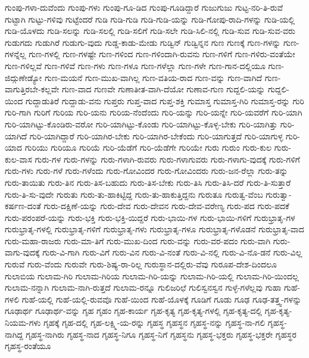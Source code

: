 {ಗುಂಪು-ಗಳಾ-ದುವೆಂದು
ಗುಂಪು-ಗಳು
ಗುಂಪು-ಗೂ-ಡಿದ
ಗುಂಪು-ಗೂಡಿದ್ದಾರೆ
ಗುಜುಗುಜು
ಗುಟ್ಟ-ನರಿ-ತಿ-ರುವೆ
ಗುಟ್ಟಾಗಿ
ಗುಟ್ಟು-ಗಳಿವು
ಗುಟ್ಟೆಂದರೆ
ಗುಡಿ
ಗುಡಿ-ಗುಡಿ
ಗುಡಿ-ಗುಡಿ-ಯನ್ನು
ಗುಡಿ-ಗೋಪು-ರಾದಿ-ಗಳನ್ನು
ಗುಡಿ-ಯಲ್ಲಿ
ಗುಡಿ-ಯೊಳದು
ಗುಡಿ-ಸಲನ್ನು
ಗುಡಿ-ಸಲಲ್ಲಿ
ಗುಡಿ-ಸಲಿಗೆ
ಗುಡಿ-ಸಲೇ
ಗುಡಿ-ಸಿಲಿ-ನಲ್ಲಿ
ಗುಡಿ-ಸುವ
ಗುಡಿ-ಸುವ-ವರು
ಗುಡುಗದು
ಗುಡುಗಿರೆ
ಗುಡುಗು-ವುದು
ಗುಡ್ಡ-ಕಾಡು-ಮೇಡು
ಗುಡ್ವಿನ್
ಗುಡ್ವಿನ್ನನ
ಗುಣ
ಗುಣಕ್ಕೆ
ಗುಣ-ಗಳನ್ನು
ಗುಣ-ಗಳನ್ನೆಲ್ಲ
ಗುಣ-ಗಳಲ್ಲಿ
ಗುಣ-ಗಳಷ್ಟೇ
ಗುಣ-ಗಳಿಂದ
ಗುಣ-ಗಳಿಂದಾಗಿ-ರುವನು
ಗುಣ-ಗಳಿಗೆ
ಗುಣ-ಗಳಿರು-ವಂತೆಯೇ
ಗುಣ-ಗಳಿಲ್ಲವೆ
ಗುಣ-ಗಳಿವೆ
ಗುಣ-ಗಳು
ಗುಣ-ಗಳೂ
ಗುಣ-ಗಳೆಲ್ಲಾ
ಗುಣ-ಗಳೇ
ಗುಣ-ಗಾನ-ದಲ್ಲಿಯೂ
ಗುಣ-ಜಿದ್ಗುಣೇಡ್ಯೋ
ಗುಣ-ಮಯನೆ
ಗುಣ-ಮುಖ-ವಾಗಿಲ್ಲ
ಗುಣ-ವತಿಯ-ರಾದ
ಗುಣ-ವನ್ನು
ಗುಣ-ವಾಗಿದೆ
ಗುಣ-ವಾಗುತ್ತಿರಬೇ-ಕಲ್ಲವೇ
ಗುಣ-ವಾದ
ಗುಣವೇ
ಗುಣಾತೀತ-ವಾಗಿ-ದೆಯೋ
ಗುಣಾವ-ಗುಣ
ಗುದ್ದಲಿ-ಯನ್ನು
ಗುದ್ದಲಿ-ಯಿಂದ
ಗುದ್ದಾಡುತಿರೆ
ಗುದ್ದಾಡು-ವನು
ಗುಪ್ತರು
ಗುಪ್ತ-ವಾದ
ಗುಪ್ತ-ಶಕ್ತಿ
ಗುಮಾಸ್ತ
ಗುಮಾಸ್ತ-ಗಿರಿ
ಗುಮಾಸ್ತ-ರನ್ನು
ಗುರಿ
ಗುರಿ-ಗಾಗಿ
ಗುರಿಗೆ
ಗುರಿಯ
ಗುರಿ-ಯನು
ಗುರಿಯ-ನೆಂದೆಂದು
ಗುರಿ-ಯನ್ನು
ಗುರಿ-ಯನ್ನೇ
ಗುರಿ-ಯವರೆಗೆ
ಗುರಿ-ಯಾಗಿ
ಗುರಿ-ಯಾಗಿಟ್ಟು-ಕೊಂಡಿರು-ವರೋ
ಗುರಿ-ಯಾಗಿಟ್ಟು-ಕೊಂಡು
ಗುರಿ-ಯಾಗಿಟ್ಟು-ಕೊಳ್ಳ-ಬೇಕು
ಗುರಿ-ಯಾಗಿತ್ತು
ಗುರಿ-ಯಾಗಿದೆ
ಗುರಿ-ಯಾಗಿದ್ದಾರೆ
ಗುರಿ-ಯಾಗಿರ-ಬೇಕು
ಗುರಿ-ಯಾಗಿರ-ಬೇಕೆಂದು
ಗುರಿ-ಯಾಗುತ್ತದೆ
ಗುರಿ-ಯಾಗುಳ್ಳ
ಗುರಿ-ಯಾದ
ಗುರಿಯು
ಗುರಿಯೂ
ಗುರಿಯೆ
ಗುರಿ-ಯೆಡೆಗೆ
ಗುರಿ-ಯೆಡೆಗೇ
ಗುರಿಯೇ
ಗುರು
ಗುರುಂ
ಗುರು-ಕುಲ
ಗುರು-ಕುಲ-ವಾಸ
ಗುರು-ಗಳ
ಗುರು-ಗಳನ್ನು
ಗುರು-ಗಳಾಗಿ-ರುವರು
ಗುರು-ಗಳಾಗುವರು
ಗುರು-ಗಳಾಗು-ವುದಕ್ಕೆ
ಗುರು-ಗಳಿಗೆ
ಗುರು-ಗಳು
ಗುರು-ಗಳೆ
ಗುರು-ಗಳೆಂದು
ಗುರು-ಗೋವಿಂದರ
ಗುರು-ಗೋವಿಂದರು
ಗುರು-ಜನ-ರೆಲ್ಲಾ
ಗುರು-ತನ್ನು
ಗುರು-ತಾಯಿತು
ಗುರು-ತಿನ
ಗುರು-ತಿಸ-ಬಹುದು
ಗುರು-ತಿಸ-ಬೇಕು
ಗುರು-ತಿಸಿ
ಗುರು-ತಿಸಿ-ದರೆ
ಗುರು-ತಿ-ಸುತ್ತಾರೆ
ಗುರು-ತಿ-ಸು-ವುದೇ
ಗುರುತು
ಗುರು-ತು-ಹಾಕಿಟ್ಟಿದ್ದ
ಗುರು-ತು-ಹಾಕುತ್ತಿದ್ದನು
ಗುರುತೂ
ಗುರುತ್ವ-ವೆಂಬ
ಗುರುತ್ವಾ-ಕರ್ಷಣ-ದಂತೆ
ಗುರು-ದಕ್ಷಿಣೆ-ಯನ್ನು
ಗುರು-ದೇವ
ಗುರು-ದೇವನ
ಗುರು-ದೇವ-ವರೇಣ್ಯ
ಗುರು-ಪದ
ಗುರು-ಪದಕೆ
ಗುರು-ಪರಂಪರೆ-ಯನ್ನು
ಗುರು-ಭಕ್ತಿ
ಗುರು-ಭಕ್ತಿ-ಯಿದ್ದರೆ
ಗುರು-ಭಾಯಿ-ಗಳ
ಗುರು-ಭಾಯಿ-ಗಳಿಗೆ
ಗುರುಭ್ರಾತೃ-ಗಳ
ಗುರುಭ್ರಾತೃ-ಗಳಲ್ಲಿ
ಗುರುಭ್ರಾತೃ-ಗಳಿಗೆ
ಗುರುಭ್ರಾತೃ-ಗಳು
ಗುರುಭ್ರಾತೃ-ಗಳೂ
ಗುರುಭ್ರಾತೃ-ಗಳೊಡನೆ
ಗುರುಭ್ರಾತೃ-ವಾದ
ಗುರು-ಮಹಾ-ರಾಜರು
ಗುರು-ಮಾ-ತಿಗೆ
ಗುರು-ಮುಖ-ದಿಂದ
ಗುರು-ವನ್ನು
ಗುರು-ವರ-ಪದಂ
ಗುರು-ವಾಗಿ
ಗುರು-ವಾಗು-ವುದಕ್ಕೆ
ಗುರು-ವಿ-ಗಾಗಿ
ಗುರು-ವಿಗೆ
ಗುರು-ವಿನ
ಗುರು-ವಿ-ನಂತೆ
ಗುರು-ವಿ-ನಲ್ಲಿ
ಗುರು-ವಿ-ನೊ-ಡನೆ
ಗುರು-ವಿಲ್ಲ
ಗುರುವೆ
ಗುರು-ವೆಂದು
ಗುರುವೇ
ಗುರು-ಶಿಷ್ಯ-ರಾ-ರಿಲ್ಲ
ಗುರುಸ್ಥಾನ-ದಲ್ಲಿರು-ವೆವು
ಗುರೂಪ-ದೇಶ-ದಿಂದಲೂ
ಗುಲಾಬಿಯ
ಗುಲಾಮ-ಗಿರಿ
ಗುಲಾಮ-ಗಿರಿಯ
ಗುಲಾಮ-ಗಿರಿ-ಯನ್ನು
ಗುಲಾಮ-ಗಿರಿ-ಯಲ್ಲಿ
ಗುಲಾಮ-ಗಿರಿ-ಯಿಂದಲ್ಲ
ಗುಲಾಮ-ನನ್ನಾಗಿ
ಗುಲಾಮ-ನಾಗಿ-ರುತ್ತದೆ
ಗುಲಾಮ-ರನ್ನೂ
ಗುಲಿಜರಿಛೆ
ಗುಲಿಸ್ವನಸ್ವನ
ಗುಳ್ಳೆ-ಗಳೆಲ್ಲವು
ಗುಹಾ
ಗುಹೆ-ಗಳಲಿ
ಗುಹೆ-ಯಲ್ಲಿ
ಗುಹೆ-ಯಲ್ಲಿ-ರುವವೊ
ಗುಹೆ-ಯಿಂದ
ಗುಹೆ-ಯೊಳಕ್ಕೆ
ಗೂಡಿಗೆ
ಗೂಡು
ಗೂಢ
ಗೂಢ-ತತ್ತ್ವ-ಗಳನ್ನು
ಗೂಢಾರ್ಥ
ಗೂಢಾರ್ಥ-ವನ್ನು
ಗೃಹ
ಗೃಹಂ
ಗೃಹ-ಕಾರ್ಯ
ಗೃಹ-ಕೃತ್ಯ
ಗೃಹ-ಕೃತ್ಯ-ಗಳಲ್ಲಿ
ಗೃಹ-ಕೃತ್ಯ-ದಲ್ಲಿ
ಗೃಹ-ಕೃತ್ಯ-ನಿಯಮ-ಗಳು
ಗೃಹಕ್ಕೆ
ಗೃಹ-ದಲ್ಲಿ
ಗೃಹ-ಲಕ್ಷ್ಮಿ-ಯ-ರನ್ನು
ಗೃಹಸ್ಥ
ಗೃಹಸ್ಥನ
ಗೃಹಸ್ಥ-ನನ್ನು
ಗೃಹಸ್ಥ-ನಾ-ಗಲಿ
ಗೃಹಸ್ಥ-ನಾಗಿದ್ದ
ಗೃಹಸ್ಥ-ನಾಗಿರು
ಗೃಹಸ್ಥ-ನಾದ
ಗೃಹಸ್ಥ-ನಿಗೂ
ಗೃಹಸ್ಥ-ನಿಗೆ
ಗೃಹಸ್ಥನು
ಗೃಹಸ್ಥ-ಭಕ್ತರು
ಗೃಹಸ್ಥ-ಭಕ್ತರೇ
ಗೃಹಸ್ಥರ
ಗೃಹಸ್ಥ-ರಂತೆಯೂ
}
